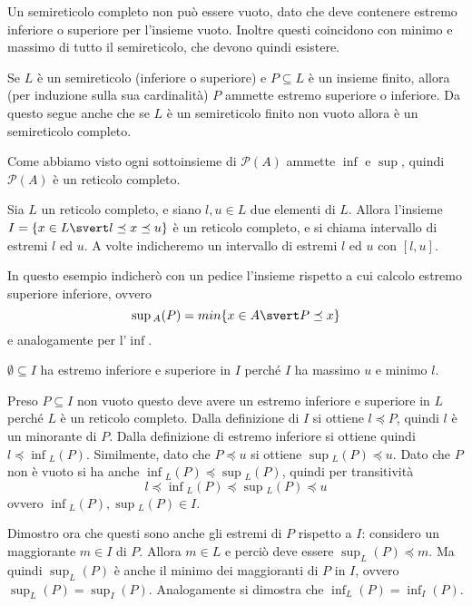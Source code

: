 \documentclass[12pt]{article}
\numberwithin{theorem}{subsection}
\begin{document}
\begin{remark}
	Un semireticolo completo non può essere vuoto, dato che deve contenere estremo inferiore o superiore per l'insieme vuoto. Inoltre questi coincidono con minimo e massimo di tutto il semireticolo, che devono quindi esistere.
\end{remark}

\begin{remark}\label{oss:finite-lattice-complete}
	Se $L$ è un semireticolo (inferiore o superiore) e $P \subseteq L$ è un insieme finito, allora (per induzione sulla sua cardinalità) $P$ ammette estremo superiore o inferiore. Da questo segue anche che se $L$ è un semireticolo finito non vuoto allora è un semireticolo completo.
\end{remark}

\begin{example}
	Come abbiamo visto ogni sottoinsieme di $\mathcal{P}(A)$ ammette $\inf$ e $\sup$, quindi $\mathcal{P}(A)$ è un reticolo completo.
\end{example}

\begin{example}[Intervallo]\label{ex:intervallo}
	Sia $L$ un reticolo completo, e siano $l, u \in L$ due elementi di $L$. Allora l'insieme $I = \{ x \in L \svert l \preceq x \preceq u \}$ è un reticolo completo, e si chiama intervallo di estremi $l$ ed $u$. A volte indicheremo un intervallo di estremi $l$ ed $u$ con $[ l, u ]$.
	
	In questo esempio indicherò con un pedice l'insieme rispetto a cui calcolo estremo superiore inferiore, ovvero
	\[
	\sup{}_A(P) = min \{ x \in A \svert P \preceq x \}
	\]
	e analogamente per l'$\inf$.
	
	$\emptyset \subseteq I$ ha estremo inferiore e superiore in $I$ perché $I$ ha massimo $u$ e minimo $l$.
	
	Preso $P \subseteq I$ non vuoto questo deve avere un estremo inferiore e superiore in $L$ perché $L$ è un reticolo completo.
	Dalla definizione di $I$ si ottiene $l \preceq P$, quindi $l$ è un minorante di $P$. Dalla definizione di estremo inferiore si ottiene quindi $l \preceq \inf{}_L(P)$. Similmente, dato che $P \preceq u$ si ottiene $\sup{}_L(P) \preceq u$.
	Dato che $P$ non è vuoto si ha anche $\inf{}_L(P) \preceq \sup{}_L(P)$, quindi per transitività
	\[
	l \preceq \inf{}_L(P) \preceq \sup{}_L(P) \preceq u
	\]
	ovvero $\inf{}_L(P), \sup{}_L(P) \in I$.

	Dimostro ora che questi sono anche gli estremi di $P$ rispetto a $I$: considero un maggiorante $m \in I$ di $P$. Allora $m \in L$ e perciò deve essere $\sup_L(P) \preceq m$. Ma quindi $\sup_L(P)$ è anche il minimo dei maggioranti di $P$ in $I$, ovvero $\sup_L(P) = \sup_I(P)$. Analogamente si dimostra che $\inf_L(P) = \inf_I(P)$.
\end{example}
\end{document}
